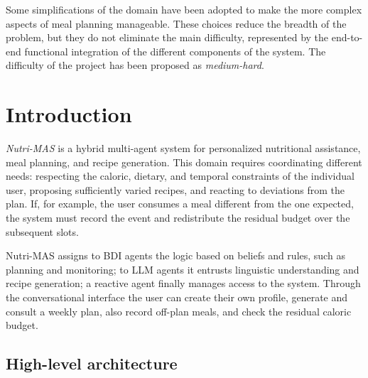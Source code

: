 \documentclass[12pt,a4paper]{article}
\begin{document}
Some simplifications of the domain have been adopted to make the
more complex aspects of meal planning manageable. These choices reduce
the breadth of the problem, but they do not eliminate the main difficulty, represented
by the end-to-end functional integration of the different components of the system.
The difficulty of the project has been proposed as \emph{medium-hard}.

\section{Introduction}
\label{sec:intro}

\emph{Nutri-MAS} is a hybrid multi-agent system for personalized nutritional
assistance, meal planning, and recipe generation. This
domain requires coordinating different needs: respecting the caloric,
dietary, and temporal constraints of the individual user, proposing sufficiently
varied recipes, and reacting to deviations from the plan. If, for example, the user consumes a
meal different from the one expected, the system must record the event and
redistribute the residual budget over the subsequent slots.

Nutri-MAS assigns to BDI agents the logic based on
beliefs and rules, such as planning and monitoring; to LLM agents it entrusts
linguistic understanding and recipe generation; a reactive agent finally manages
access to the system. Through the conversational interface the user
can create their own profile, generate and consult a weekly plan,
also record off-plan meals, and check the residual caloric budget.

\subsection{High-level architecture}
\end{document}
